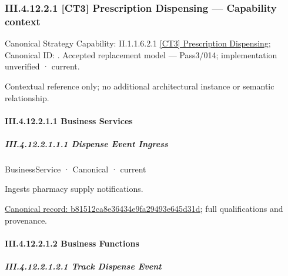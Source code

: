 \subsubsection*{III.4.12.2.1 [CT3] Prescription Dispensing — Capability context}
\label{navigation:III.4.12.2.1}

{\small Canonical Strategy Capability: II.1.1.6.2.1 \hyperref[element:2243de4f266e4ab6ba7964a1799f2c7e]{[CT3] Prescription Dispensing}; Canonical ID: \texttt{}. Accepted replacement model — Pass3/014; implementation unverified · current.}\par
Contextual reference only; no additional architectural instance or semantic relationship.\par
\paragraph*{III.4.12.2.1.1 Business Services}
\label{navigation:III.4.12.2.1.1}

\subparagraph*{III.4.12.2.1.1.1 Dispense Event Ingress}
\label{navigation:III.4.12.2.1.1.1}

\label{element:b81512ca8e36434e9fa29493e645d31d}
{\small BusinessService · Canonical · current}\par

Ingests pharmacy supply notifications.


{\footnotesize \href{../../../../../../../continuum/business/business-service/b81512ca8e36434e9fa29493e645d31d.md}{Canonical record: b81512ca8e36434e9fa29493e645d31d}; full qualifications and provenance.}\par
\paragraph*{III.4.12.2.1.2 Business Functions}
\label{navigation:III.4.12.2.1.2}

\subparagraph*{III.4.12.2.1.2.1 Track Dispense Event}
\label{navigation:III.4.12.2.1.2.1}

